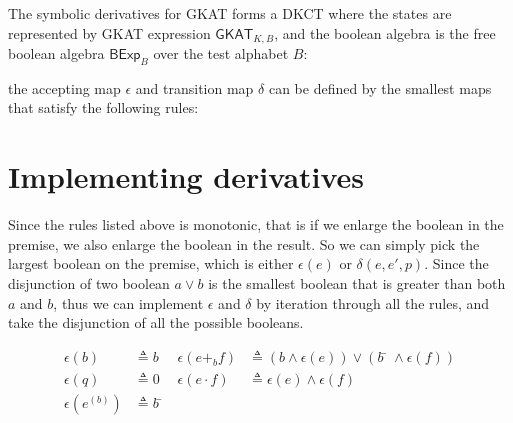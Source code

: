 \documentclass[acmsmall,screen]{acmart}
\newcommand{\theoryOf}[1]{\ensuremath{\mathsf{#1}}}
\newcommand{\GKAT}{\theoryOf{GKAT}}
\newcommand{\BExp}{\theoryOf{BExp}}
\newcommand\altxrightarrow[2][0pt]{\mathrel{\ensurestackMath{\stackengine%
  {\dimexpr#1-7.5pt}{\xrightarrow{\phantom{#2}}}{\scriptstyle\!#2\,}%
  {O}{c}{F}{F}{S}}}}
\newcommand{\transvia}[1]{
    \mathrel{\raisebox{-2px}{\(\altxrightarrow[-2px]{#1}\)}}
}
\begin{document}
The symbolic derivatives for GKAT forms a DKCT where the states are represented by GKAT expression \(\GKAT_{K, B}\), and the boolean algebra is the free boolean algebra \(\BExp_B\) over the test alphabet \(B\):
the accepting map \(ϵ\) and transition map \(δ\) can be defined by the smallest maps that satisfy the following rules:


\section{Implementing derivatives}

Since the rules listed above is monotonic, that is if we enlarge the boolean in the premise, we also enlarge the boolean in the result. 
So we can simply pick the largest boolean on the premise, which is either \(ϵ(e)\) or \(δ(e, e', p)\).
Since the disjunction of two boolean \(a ∨ b\) is the smallest boolean that is greater than both \(a\) and \(b\), thus we can implement \(ϵ\) and \(δ\) by iteration through all the rules, and take the disjunction of all the possible booleans.

\begin{align*}
    ϵ(b) & ≜ b 
        &  ϵ(e +_b f) & ≜ (b ∧ ϵ(e)) ∨ (b̄ ∧ ϵ(f))\\
    ϵ(q) & ≜ 0
        & ϵ(e ⋅ f) & ≜ ϵ(e) ∧ ϵ(f)\\  
    ϵ(e^{(b)}) & ≜ b̄ 
\end{align*}
\end{document}
